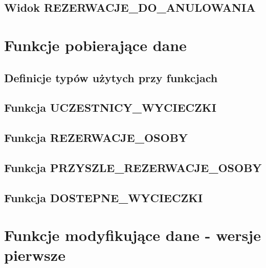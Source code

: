 \documentclass[a4paper, 11pt]{article}
\begin{document}
    \subsection{Widok REZERWACJE\_DO\_ANULOWANIA}
    

    \newpage


    \section{Funkcje pobierające dane}

    \subsection{Definicje typów użytych przy funkcjach}
    

    \newpage

    \subsection{Funkcja UCZESTNICY\_WYCIECZKI}
    

    \newpage

    \subsection{Funkcja REZERWACJE\_OSOBY}
    

    \newpage

    \subsection{Funkcja PRZYSZLE\_REZERWACJE\_OSOBY}
    

    \newpage

    \subsection{Funkcja DOSTEPNE\_WYCIECZKI}
    

    \newpage

    \section{Funkcje modyfikujące dane - wersje pierwsze}
\end{document}
